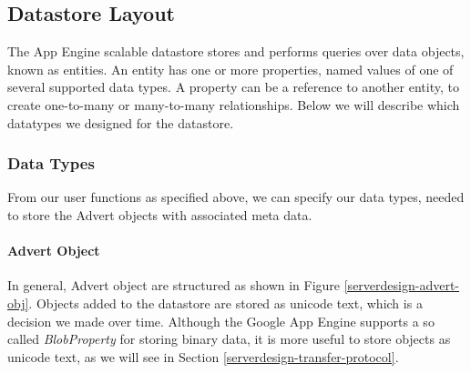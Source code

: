 %

\subsection{Datastore Layout}
The App Engine scalable datastore stores and performs queries over data objects,
known as entities. An entity has one or more properties, named values of one of
several supported data types. A property can be a reference to another entity, to
create one-to-many or many-to-many relationships. Below we will describe which
datatypes we designed for the datastore.

\subsubsection{Data Types}
From our user functions as specified above, we can specify our data types,
needed to store the Advert objects with associated meta data.

\paragraph{Advert Object}
In general, Advert object are structured as shown in Figure
\ref{serverdesign-advert-obj}. Objects added to the datastore are stored as
unicode text, which is a decision we made over time. Although the Google App
Engine supports a so called \emph{BlobProperty} for storing binary data, it is
more useful to store objects as unicode text, as we will see in Section
\ref{serverdesign-transfer-protocol}.

